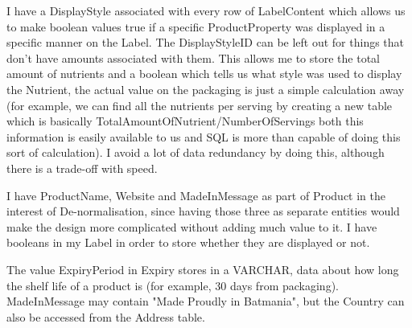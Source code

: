 I have a DisplayStyle associated with every row of LabelContent which allows us to make boolean values true if a specific ProductProperty was displayed in a specific manner on the Label. The DisplayStyleID can be left out for things that don't have amounts associated with them. This allows me to store the total amount of nutrients and a boolean which tells us what style was used to display the Nutrient, the actual value on the packaging is just a simple calculation away (for example, we can find all the nutrients per serving by creating a new table which is basically TotalAmountOfNutrient/NumberOfServings both this information is easily available to us and SQL is more than capable of doing this sort of calculation). I avoid a lot of data redundancy by doing this, although there is a trade-off with speed. 

I have ProductName, Website and MadeInMessage as part of Product in the interest of De-normalisation, since having those three as separate entities would make the design more complicated without adding much value to it. I have booleans in my Label in order to store whether they are displayed or not. 

The value ExpiryPeriod in Expiry stores in a VARCHAR, data about how long the shelf life of a product is (for example, 30 days from packaging). MadeInMessage may contain "Made Proudly in Batmania", but the Country can also be accessed from the Address table. 

